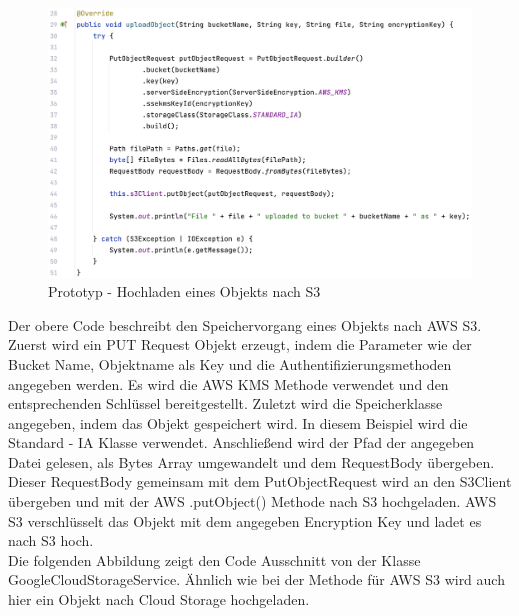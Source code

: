 \begin{figure}[h]
	\centering
	\includegraphics[width=15cm,keepaspectratio]{Pictures/UploadObjectAWS.png}
	\caption{Prototyp - Hochladen eines Objekts nach S3}
\end{figure}

\newpage

Der obere Code beschreibt den Speichervorgang eines Objekts nach AWS S3. Zuerst wird ein PUT Request Objekt erzeugt, indem die Parameter wie der Bucket Name, Objektname als Key und die Authentifizierungsmethoden angegeben werden. Es wird die AWS KMS Methode verwendet und den entsprechenden Schlüssel bereitgestellt. Zuletzt wird die Speicherklasse angegeben, indem das Objekt gespeichert wird. In diesem Beispiel wird die Standard - IA Klasse verwendet. Anschließend wird der Pfad der angegeben Datei gelesen, als Bytes Array umgewandelt und dem RequestBody übergeben. Dieser RequestBody gemeinsam mit dem PutObjectRequest wird an den S3Client übergeben und mit der AWS .putObject() Methode nach S3 hochgeladen. AWS S3 verschlüsselt das Objekt mit dem angegeben Encryption Key und ladet es nach S3 hoch.\\

Die folgenden Abbildung zeigt den Code Ausschnitt von der Klasse GoogleCloudStorageService. Ähnlich wie bei der Methode für AWS S3 wird auch hier ein Objekt nach Cloud Storage hochgeladen. 

